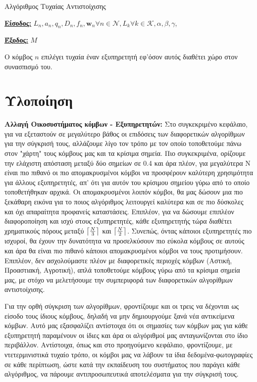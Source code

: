 \begin{algorithm}[h]
\caption{Αλγόριθμος Τυχαίας Αντιστοίχισης} \label{algorithm 4}
\begin{algorithmic}[1]
\STATE \textbf{\underline{Είσοδος:}} ${L_n, a_n, q_n, D_n, f_n, \mathbf{w}_n}{\forall n\in \mathcal{N}}, {L_k}{\forall k \in \mathcal{K}}, \alpha,\beta,\gamma$,

\STATE \textbf{\underline{Έξοδος:}}  $M$

\STATE Ο κόμβος $n$ επιλέγει τυχαία έναν εξυπηρετητή εφ'όσον αυτός διαθέτει χώρο στον συνασπισμό του.
\ENDFOR
\end{algorithmic}
\end{algorithm}
\vspace{-7pt}

\section{Υλοποίηση}

\textbf{Αλλαγή Οικοσυστήματος κόμβων - Εξυπηρετητών:} Στο συγκεκριμένο κεφάλαιο, για να εξεταστούν σε μεγαλύτερο βάθος οι επιδόσεις των διαφορετικών αλγορίθμων για την σύγκρισή τους, αλλάζουμε λίγο τον τρόπο με τον οποίο τοποθετούμε πάνω στον "χάρτη" τους κόμβους μας και τα κρίσιμα σημεία. Πιο συγκεκριμένα, ορίζουμε την ελάχιστη απόσταση μεταξύ δύο σημείων σε 0.4 και άρα πλέον, για μεγαλύτερα Ν είναι πιο πιθανό οι πιο απομακρυσμένοι κόμβοι να προσφέρουν καλύτερη χρησιμότητα για άλλους εξυπηρετητές, απ' ότι για αυτόν του κρίσιμου σημείου γύρω από το οποίο τοποθετήθηκαν αρχικά. Οι απομακρυσμένοι λοιπόν κόμβοι, θα μας δώσουν μια πιο ξεκάθαρη εικόνα για το ποιος αλγόριθμος λειτουργεί καλύτερα και σε πιο δύσκολες και όχι απαραίτητα προφανείς καταστάσεις. Επιπλέον, για να δώσουμε επιπλέον διαφοροποίηση και ισχύ στους εξυπηρετητές, κάθε εξυπηρετητής τώρα διαθέτει χρηματικούς πόρους μεταξύ $\ceil*{\frac{N}{3}}$ και $\ceil*{\frac{N}{2}}$. Συνεπώς, όντας κάποιοι εξυπηρετητές πιο ισχυροί, θα έχουν την δυνατότητα να προσελκύσουν πιο εύκολα κόμβους σε αυτούς και άρα θα είναι πιο πιθανό κάποιοι απομακρυσμένοι κόμβοι να τους προτιμήσουν. Επιπλέον, δεν ασχολούμαστε πλέον με διαφορετικές περιοχές κόμβων (Αστική, Προαστιακή, Αγροτική), απλά τοποθετούμε κόμβους γύρω από τα κρίσιμα σημεία μας, με στόχο να μελετήσουμε την συμπεριφορά των διαφορετικών αλγορίθμων αντιστοίχισης.

Για την ορθή σύγκριση των αλγορίθμων, φροντίζουμε και οι τρεις να δέχονται ως είσοδο τους ίδιους κόμβους, δηλαδή να μην δημιουργούμε ξανά νέα αντικείμενα κόμβων. Αυτό μας εξασφαλίζει αντίστοιχα ότι οι σημασίες των κόμβων μας για κάθε εξυπηρετητή παραμένουν οι ίδιες και άρα οι αλγόριθμοί μας ανταγωνίζονται στο ίδιο περιβάλλον. Αντίστοιχα, όπως και στο προηγούμενο κεφάλαιο, φροντίζουμε, με ντετερμινιστικά τυχαίο τρόπο, οι κόμβοι μας να λάβουν τα ίδια δεδομένα-φωτογραφίες σε κάθε περίπτωση, ώστε κατά την εκπαίδευση του συστήματος που παράγει κάθε αλγόριθμος, να πάρουμε αντιπροσωπευτικά αποτελέσματα για την σύγκρισή τους. 

